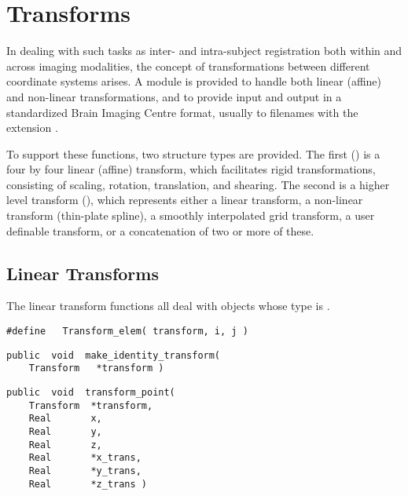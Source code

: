 \chapter{Transforms}

In dealing with such tasks as inter- and intra-subject registration
both within and across imaging modalities, the concept of
transformations between different coordinate systems arises.  A module
is provided to handle both linear (affine) and non-linear
transformations, and to provide input and output in a standardized
Brain Imaging Centre format, usually to filenames with the extension
.

To support these functions, two structure types are provided.  The
first () is a four by four linear (affine) transform,
which facilitates rigid transformations, consisting of scaling, rotation,
translation, and shearing.  The second is a higher level transform
(), which represents either a linear
transform, a non-linear transform (thin-plate spline), a smoothly interpolated
grid transform, a user
definable transform, or a concatenation of two or more of these.

\section{Linear Transforms}

The linear transform functions all deal with objects whose type is
.

{\bf\begin{verbatim}
#define   Transform_elem( transform, i, j )
\end{verbatim}}


{\bf\begin{verbatim}
public  void  make_identity_transform(
    Transform   *transform )
\end{verbatim}}


{\bf\begin{verbatim}
public  void  transform_point(
    Transform  *transform,
    Real       x,
    Real       y,
    Real       z,
    Real       *x_trans,
    Real       *y_trans,
    Real       *z_trans )
\end{verbatim}}

